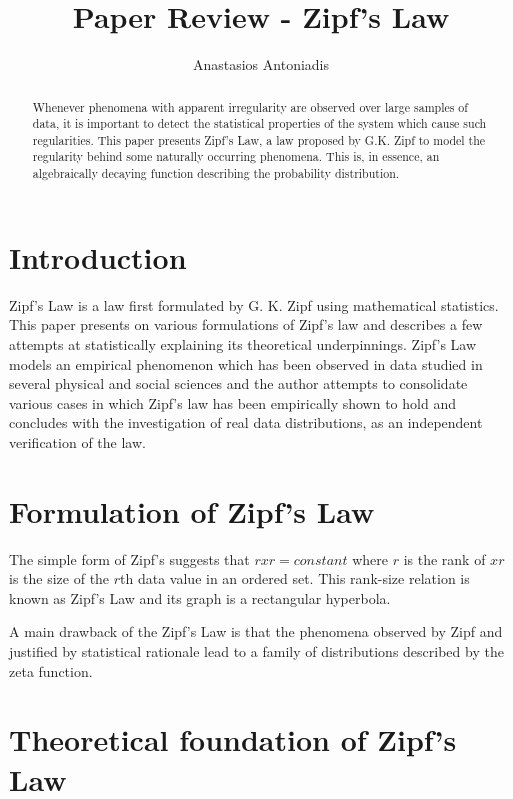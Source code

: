 \documentclass{article} \usepackage{hyperref} \usepackage{graphicx}
\begin{document}
\title{Paper Review - Zipf's Law} \author{Anastasios Antoniadis}

\maketitle

\begin{abstract}

Whenever phenomena with apparent irregularity are observed over large
samples of data, it is important to detect the statistical properties of the
system which cause such regularities. This paper presents Zipf's Law, a law
proposed by G.K. Zipf to model the regularity behind some naturally
occurring phenomena. This is, in essence, an algebraically decaying function
describing the probability distribution.
\end{abstract}

\section{Introduction}

Zipf's Law is a law first formulated by G. K. Zipf using mathematical
statistics. This paper presents on various formulations of Zipf's law and
describes a few attempts at statistically explaining its theoretical
underpinnings. Zipf's Law models an empirical phenomenon which has been
observed in data studied in several physical and social sciences and the
author attempts to consolidate various cases in which Zipf's law has been
empirically shown to hold and concludes with the investigation of real data
distributions, as an independent verification of the law.

\section{Formulation of Zipf's Law}

The simple form of Zipf's suggests that $rxr = constant$ where $r$ is the
rank of $xr$ is the size of the $r$th data value in an ordered set. This
rank-size relation is known as Zipf's Law and its graph is a rectangular
hyperbola.

A main drawback of the Zipf's Law is that the phenomena observed by Zipf and
justified by statistical rationale lead to a family of distributions
described by the zeta function.

\section{Theoretical foundation of Zipf's Law}
\end{document}
